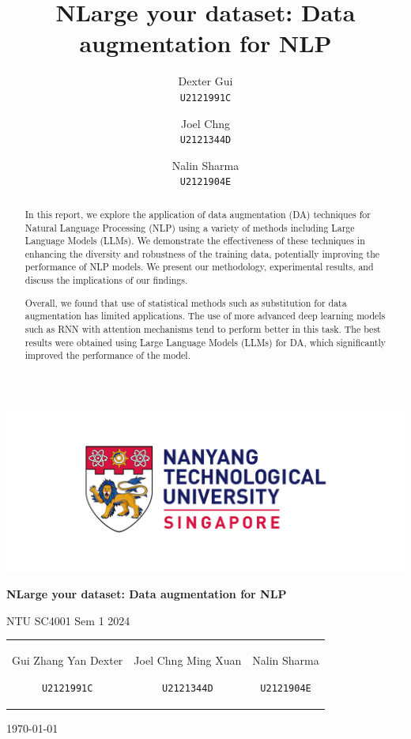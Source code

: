 \documentclass[10pt]{extarticle}
\title{NLarge your dataset: Data augmentation for NLP}
\author{
    Dexter Gui \\
    \texttt{U2121991C}
    \and
    Joel Chng \\
    \texttt{U2121344D}
    \and
    Nalin Sharma \\
    \texttt{U2121904E}
}
\begin{document}
\begin{titlepage}
  \centering
  \includegraphics[width=1\textwidth]{img/ntu_logo.jpg}\par\vspace{1cm}
  \vspace{1.5cm}
  {\huge\bfseries NLarge your dataset: Data augmentation for NLP\par}
  \vspace{0.5cm}
  {\large NTU SC4001 Sem 1 2024\par}
  \vspace{2cm}
  \begin{tabular}{ccc}
    \begin{minipage}[t]{0.3\textwidth}
      \centering
      {\Large Gui Zhang Yan Dexter\par}
      \texttt{U2121991C}
    \end{minipage} &
    \begin{minipage}[t]{0.3\textwidth}
      \centering
      {\Large Joel Chng Ming Xuan\par}
      \texttt{U2121344D}
    \end{minipage} &
    \begin{minipage}[t]{0.3\textwidth}
      \centering
      {\Large Nalin Sharma\par}
      \texttt{U2121904E}
    \end{minipage}
  \end{tabular}
  \vfill
  \today
\end{titlepage}

\begin{abstract}

  In this report, we explore the application of data augmentation (DA) techniques
  for Natural Language Processing (NLP) using a variety of methods including
  Large Language Models (LLMs). We demonstrate the effectiveness of these
  techniques in enhancing the diversity and robustness of the training data,
  potentially improving the performance of NLP models. We present our
  methodology, experimental results, and discuss the implications of our
  findings.

  Overall, we found that use of statistical methods such as substitution for data
  augmentation has limited applications. The use of more advanced deep learning
  models such as RNN with attention mechanisms tend to perform better in this
  task. The best results were obtained using Large Language Models (LLMs) for DA,
  which significantly improved the performance of the model.

\end{abstract}
\end{document}
